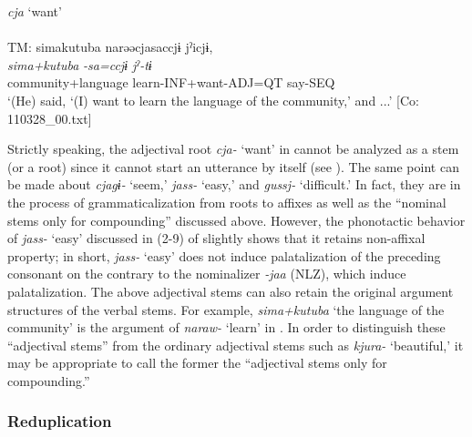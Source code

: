 \ea  \textit{cja} ‘want’ \label{ex:4.36}\\\\
\glll  TM:  simakutuba   narəəcjasaccjɨ  jˀicjɨ,\\
    \textit{sima+kutuba}  \textit{-sa=ccjɨ  jˀ-tɨ}\\
    community+language  learn-INF+want-ADJ=QT  say-SEQ\\
    \glt     ‘(He) said, ‘(I) want to learn the language of the community,’ and ...’ [Co: 110328\_00.txt]
\z

Strictly speaking, the adjectival root \textit{cja-} ‘want’ in  cannot be analyzed as a stem (or a root) since it cannot start an utterance by itself (see ). The same point can be made about \textit{cjagɨ-} ‘seem,’ \textit{jass-} ‘easy,’ and \textit{gussj-} ‘difficult.’ In fact, they are in the process of grammaticalization from roots to affixes as well as the “nominal stems only for compounding” discussed above. However, the phonotactic behavior of \textit{jass-} ‘easy’ discussed in (2-9) of  slightly shows that it retains non-affixal property; in short, \textit{jass-} ‘easy’ does not induce palatalization of the preceding consonant on the contrary to the nominalizer \textit{{}-jaa} (NLZ), which induce palatalization. The above adjectival stems can also retain the original argument structures of the verbal stems. For example, \textit{sima+kutuba} ‘the language of the community’ is the argument of \textit{naraw-} ‘learn’ in . In order to distinguish these “adjectival stems” from the ordinary adjectival stems such as \textit{kjura-} ‘beautiful,’ it may be appropriate to call the former the “adjectival stems only for compounding.”

\subsubsection{Reduplication}\label{sec:4.2.3.3}


